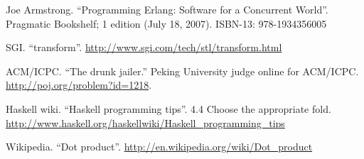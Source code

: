 \documentclass[b5paper]{ctexart}
\begin{document}
\begin{thebibliography}{99}
Joe Armstrong. ``Programming Erlang: Software for a Concurrent World''. Pragmatic Bookshelf; 1 edition (July 18, 2007). ISBN-13: 978-1934356005

SGI. ``transform''. \url{http://www.sgi.com/tech/stl/transform.html}

ACM/ICPC. ``The drunk jailer.'' Peking University judge online for ACM/ICPC. \url{http://poj.org/problem?id=1218}.

Haskell wiki. ``Haskell programming tips''. 4.4 Choose the appropriate fold. \url{http://www.haskell.org/haskellwiki/Haskell_programming_tips}

Wikipedia. ``Dot product''. \url{http://en.wikipedia.org/wiki/Dot_product}

\end{thebibliography}

\ifx\wholebook\relax \else
\end{document}
